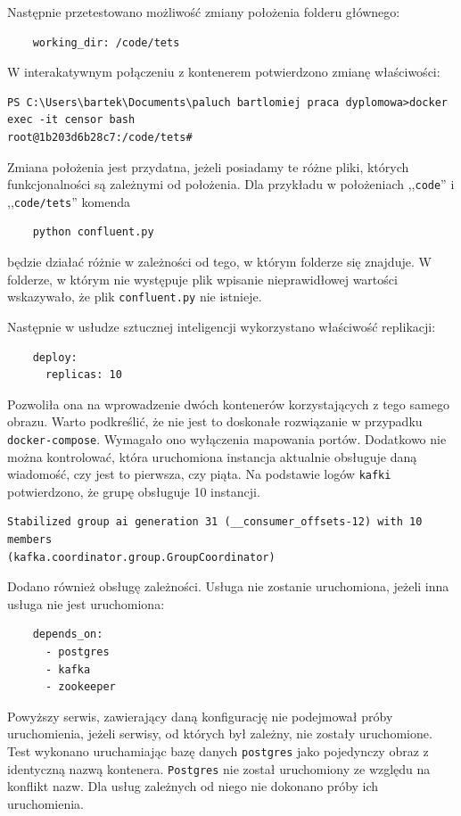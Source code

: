 \documentclass[12pt,twoside]{article}
\begin{document}
Następnie przetestowano możliwość zmiany położenia folderu głównego:
\begin{lstlisting}
    working_dir: /code/tets
\end{lstlisting}
W interakatywnym połączeniu z kontenerem potwierdzono zmianę właściwości:
\begin{lstlisting}
PS C:\Users\bartek\Documents\paluch bartlomiej praca dyplomowa>docker exec -it censor bash
root@1b203d6b28c7:/code/tets#
\end{lstlisting}
Zmiana położenia jest przydatna, jeżeli posiadamy te różne pliki, których funkcjonalności są zależnymi od położenia. Dla przykładu w położeniach ,,\texttt{code}'' i ,,\texttt{code/tets}'' komenda
\begin{lstlisting}
    python confluent.py
\end{lstlisting}
będzie działać różnie w zależności od tego, w którym folderze się znajduje.
W folderze, w którym nie występuje plik wpisanie nieprawidłowej wartości wskazywało, że plik \texttt{confluent.py} nie istnieje.

Następnie w usłudze sztucznej inteligencji wykorzystano właściwość replikacji:
\begin{lstlisting}
    deploy:
      replicas: 10
\end{lstlisting}
Pozwoliła ona na wprowadzenie dwóch kontenerów korzystających z tego samego obrazu. Warto podkreślić, że nie jest to doskonałe rozwiązanie w przypadku \texttt{docker-compose}. Wymagało ono wyłączenia mapowania portów. Dodatkowo nie można kontrolować, która uruchomiona instancja aktualnie obsługuje daną wiadomość, czy jest to pierwsza, czy piąta. Na podstawie logów \texttt{kafki} potwierdzono, że grupę obsługuje 10 instancji. 
\begin{lstlisting}
Stabilized group ai generation 31 (__consumer_offsets-12) with 10 members 
(kafka.coordinator.group.GroupCoordinator)
\end{lstlisting}

Dodano również obsługę zależności. Usługa nie zostanie uruchomiona, jeżeli inna usługa nie jest uruchomiona:
\begin{lstlisting}
    depends_on:
      - postgres
      - kafka
      - zookeeper
\end{lstlisting}
Powyższy serwis, zawierający daną konfigurację nie podejmował próby uruchomienia, jeżeli serwisy, od których był zależny, nie zostały uruchomione. Test wykonano uruchamiając bazę danych \texttt{postgres} jako pojedynczy obraz z identyczną nazwą kontenera. \texttt{Postgres} nie został uruchomiony ze względu na konflikt nazw. Dla usług zależnych od niego nie dokonano próby ich uruchomienia. 
\end{document}

